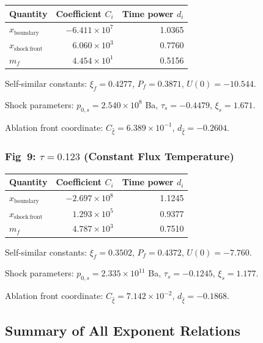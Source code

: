 \documentclass[11pt]{article}
\begin{document}
\begin{center}
\begin{tabular}{l r r}
\hline
Quantity & Coefficient $C_i$ & Time power $d_i$ \\
\hline
$x_{\mathrm{boundary}}$ & $-6.411 \times 10^{7}$ & 1.0365 \\
$x_{\mathrm{shock\,front}}$ & $6.060 \times 10^{3}$ & 0.7760 \\
$m_f$ & $4.454 \times 10^{1}$ & 0.5156 \\
\hline
\end{tabular}
\end{center}

Self-similar constants:
$\xi_f = 0.4277$, $P_f = 0.3871$, $U(0) = -10.544$.

Shock parameters:
$p_{0,s} = 2.540 \times 10^{8}$ Ba, $\tau_s = -0.4479$, $\xi_s = 1.671$.

Ablation front coordinate:
$C_{\hat{\xi}} = 6.389\times10^{-1}$, $d_{\hat{\xi}} = -0.2604$.

\subsubsection{Fig~9: $\tau=0.123$ (Constant Flux Temperature)}

\begin{center}
\begin{tabular}{l r r}
\hline
Quantity & Coefficient $C_i$ & Time power $d_i$ \\
\hline
$x_{\mathrm{boundary}}$ & $-2.697 \times 10^{8}$ & 1.1245 \\
$x_{\mathrm{shock\,front}}$ & $1.293 \times 10^{5}$ & 0.9377 \\
$m_f$ & $4.787 \times 10^{3}$ & 0.7510 \\
\hline
\end{tabular}
\end{center}

Self-similar constants:
$\xi_f = 0.3502$, $P_f = 0.4372$, $U(0) = -7.760$.

Shock parameters:
$p_{0,s} = 2.335 \times 10^{11}$ Ba, $\tau_s = -0.1245$, $\xi_s = 1.177$.

Ablation front coordinate:
$C_{\hat{\xi}} = 7.142\times10^{-2}$, $d_{\hat{\xi}} = -0.1868$.

\subsection{Summary of All Exponent Relations}
\end{document}
